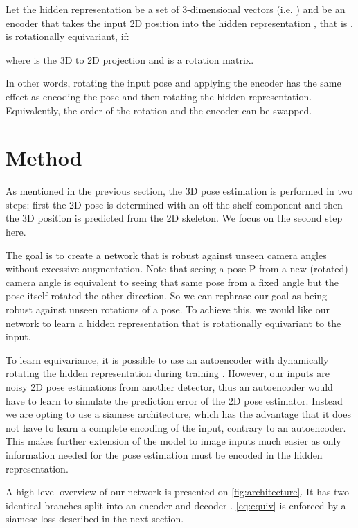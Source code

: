 \documentclass[preprint]{elsarticle}
\begin{document}
\begin{definition} 
Let the hidden representation  be a set of  3-dimensional vectors (i.e. ) and  be an encoder that takes the input 2D position into the hidden representation , that is .  is rotationally equivariant, if:

where  is the 3D to 2D projection and  is a rotation matrix.
\end{definition}

In other words, rotating the input pose and applying the encoder  has the same effect as encoding the pose and then rotating the hidden representation. Equivalently, the order of the rotation and the encoder can be swapped. 

\section{Method}
As mentioned in the previous section, the 3D pose estimation is performed in two steps: first the 2D pose is determined with an off-the-shelf component and then the 3D position is predicted from the 2D skeleton. We focus on the second step here.

The goal is to create a network that is robust against unseen camera angles without excessive augmentation. Note that seeing a pose P from a new (rotated) camera angle is equivalent to seeing that same pose from a fixed angle but the pose itself rotated the other direction. So we can rephrase our goal as being robust against unseen rotations of a pose. To achieve this, we would like our network to learn a hidden representation  that is rotationally equivariant to the input.

To learn equivariance, it is possible to use an autoencoder with dynamically rotating the hidden representation during training \cite{helge_geometry-aware}. However, our inputs are noisy 2D pose estimations from another detector, thus an autoencoder would have to learn to simulate the prediction error of the 2D pose estimator. Instead we are opting to use a siamese architecture, which has the advantage that it does not have to learn a complete encoding of the input, contrary to an autoencoder. This makes further extension of the model to image inputs much easier as only information needed for the pose estimation must be encoded in the hidden representation. 

A high level overview of our network is presented on \autoref{fig:architecture}. It has two identical branches split into an encoder  and decoder . \autoref{eq:equiv} is enforced by a siamese loss described in the next section. 
\end{document}
